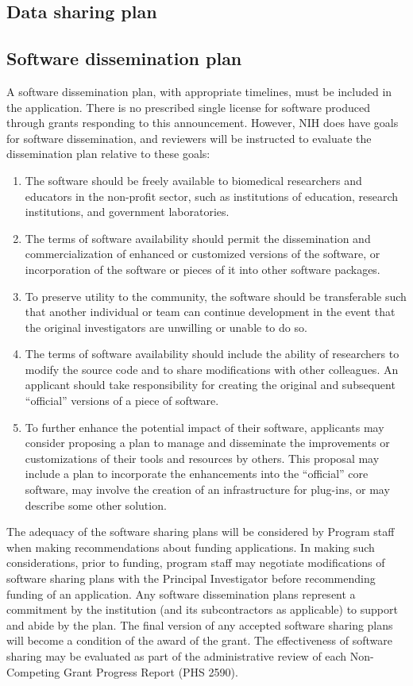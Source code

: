 \documentclass[12pt]{article}
\newcommand{\instructions}[1]{}
\renewcommand{\instructions}[1]{{\scriptsize \sc #1}}
\begin{document}
\subsection*{Data sharing plan}


\subsection*{Software dissemination plan}

\instructions{A software dissemination plan, with appropriate
  timelines, must be included in the application. There is no
  prescribed single license for software produced through grants
  responding to this announcement.  However, NIH does have goals for
  software dissemination, and reviewers will be instructed to evaluate
  the dissemination plan relative to these goals:
\begin{enumerate}
\item The software should be freely available to biomedical
  researchers and educators in the non-profit sector, such as
  institutions of education, research institutions, and government
  laboratories.
\item The terms of software availability should permit the
  dissemination and commercialization of enhanced or customized
  versions of the software, or incorporation of the software or pieces
  of it into other software packages.
\item To preserve utility to the community, the software should be
  transferable such that another individual or team can continue
  development in the event that the original investigators are
  unwilling or unable to do so.
\item The terms of software availability should include the ability of
  researchers to modify the source code and to share modifications
  with other colleagues.  An applicant should take responsibility for
  creating the original and subsequent ``official'' versions of a
  piece of software.
\item To further enhance the potential impact of their software,
  applicants may consider proposing a plan to manage and disseminate
  the improvements or customizations of their tools and resources by
  others.  This proposal may include a plan to incorporate the
  enhancements into the ``official'' core software, may involve the
  creation of an infrastructure for plug-ins, or may describe some
  other solution.
\end{enumerate}
The adequacy of the software sharing plans will be considered by
Program staff when making recommendations about funding applications.
In making such considerations, prior to funding, program staff may
negotiate modifications of software sharing plans with the Principal
Investigator before recommending funding of an application. Any
software dissemination plans represent a commitment by the institution
(and its subcontractors as applicable) to support and abide by the
plan.  The final version of any accepted software sharing plans will
become a condition of the award of the grant. The effectiveness of
software sharing may be evaluated as part of the administrative review
of each Non-Competing Grant Progress Report (PHS 2590).}
\end{document}
